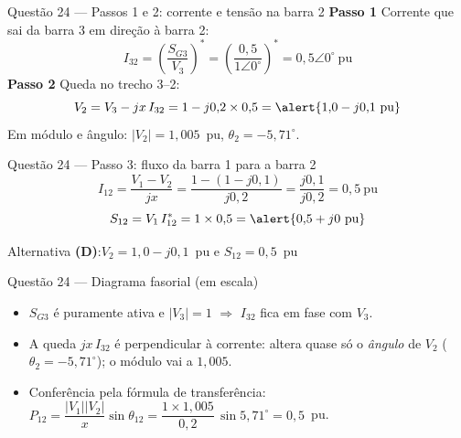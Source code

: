 \documentclass[aspectratio=169,11pt]{beamer}
\newcommand{\passo}[1]{{\color{Teal}\bfseries #1}\enspace}
\begin{document}
\begin{frame}{Questão 24 --- Passos 1 e 2: corrente e tensão na barra 2}
  \passo{Passo 1} Corrente que sai da barra 3 em direção à barra 2:
  \[
    I_{32} = \left(\frac{S_{G3}}{V_3}\right)^{\!*}
           = \left(\frac{0{,}5}{1\angle 0^\circ}\right)^{\!*} = 0{,}5\angle 0^\circ~\text{pu}
  \]
  \pause
  \passo{Passo 2} Queda no trecho 3--2:
  \[
    V_2 = V_3 - jx\,I_{32} = 1 - j0{,}2 \times 0{,}5
        = \alert{1{,}0 - j0{,}1~\text{pu}}
  \]
  \pause
  {\small\color{Mute} Em módulo e ângulo: $|V_2| = 1{,}005$~pu,
  $\theta_2 = -5{,}71^\circ$.}
\end{frame}

\begin{frame}{Questão 24 --- Passo 3: fluxo da barra 1 para a barra 2}
  \[
    I_{12} = \frac{V_1 - V_2}{jx} = \frac{1 - (1 - j0{,}1)}{j0{,}2}
           = \frac{j0{,}1}{j0{,}2} = 0{,}5~\text{pu}
  \]
  \pause
  \[
    S_{12} = V_1\, I_{12}^{*} = 1 \times 0{,}5 = \alert{0{,}5 + j0~\text{pu}}
  \]
  \pause
  \begin{resposta}
    \centering Alternativa \textbf{(D)}:\quad $V_2 = 1{,}0 - j0{,}1$~pu
    \quad e \quad $S_{12} = 0{,}5$~pu
  \end{resposta}
\end{frame}

\begin{frame}{Questão 24 --- Diagrama fasorial (em escala)}
  \centering

  \vspace{0.8em}\raggedright\small
  \begin{itemize}
    \pause
    \item $S_{G3}$ é puramente ativa e $|V_3|=1$ $\Rightarrow$ $I_{32}$ fica
          \alert{em fase} com $V_3$.
    \pause
    \item A queda $jx\,I_{32}$ é perpendicular à corrente: altera quase só o
          \emph{ângulo} de $V_2$ ($\theta_2 = -5{,}71^\circ$); o módulo vai a $1{,}005$.
    \pause
    \item Conferência pela fórmula de transferência:
          $P_{12} = \dfrac{|V_1||V_2|}{x}\sin\theta_{12}
          = \dfrac{1 \times 1{,}005}{0{,}2}\,\sin 5{,}71^\circ = 0{,}5$~pu.
  \end{itemize}
\end{frame}
\end{document}
